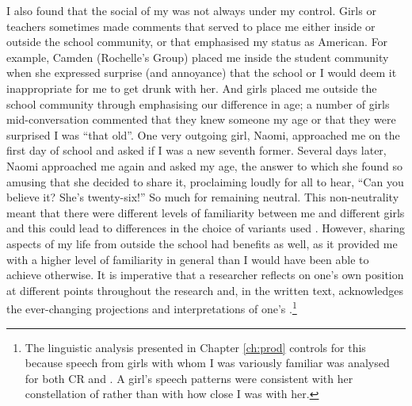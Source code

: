 I also found that the social  of my  was not always under my control. Girls or teachers sometimes made comments that served to place me either inside or outside the school community, or that emphasised my status as American. For example, Camden (Rochelle's Group) placed me inside the student community when she expressed surprise (and annoyance) that the school or I would deem it inappropriate for me to get drunk with her. And girls placed me outside the school community through emphasising our difference in age; a number of girls mid-conversation commented that they knew someone my age or that they were surprised I was ``that old''. One very outgoing girl, Naomi, approached me on the first day of school and asked if I was a new seventh former. Several days later, Naomi approached me again and asked my age, the answer to which she found so amusing that she decided to share it, proclaiming loudly for all to hear, ``Can you believe it?  She's twenty-six!''  So much for remaining neutral. This non-neutrality meant that there were different levels of familiarity between me and different girls and this could lead to differences in the choice of variants used \citep{cukoravilabailey}. However, sharing aspects of my life from outside the school had benefits as well, as it provided me with a higher level of familiarity in general than I would have been able to achieve otherwise. It is imperative that a researcher reflects on one's own position at different points throughout the research and, in the written text, acknowledges the ever-changing projections and interpretations of one's .\footnote{The linguistic analysis presented in Chapter \ref{ch:prod} controls for this because speech from girls with whom I was variously familiar was analysed for both CR and . A girl's speech patterns were consistent with her constellation of  rather than with how close I was with her.}  





